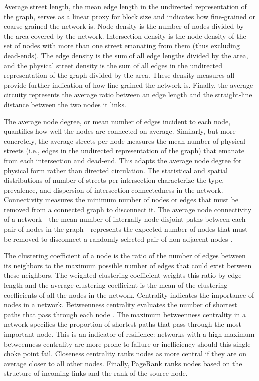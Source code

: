 \documentclass{article}
\begin{document}
Average street length, the mean edge length in the undirected representation of the graph, serves as a linear proxy for block size and indicates how fine-grained or coarse-grained the network is. Node density is the number of nodes divided by the area covered by the network. Intersection density is the node density of the set of nodes with more than one street emanating from them (thus excluding dead-ends). The edge density is the sum of all edge lengths divided by the area, and the physical street density is the sum of all edges in the undirected representation of the graph divided by the area. These density measures all provide further indication of how fine-grained the network is. Finally, the average circuity represents the average ratio between an edge length and the straight-line distance between the two nodes it links.

The average node degree, or mean number of edges incident to each node, quantifies how well the nodes are connected on average. Similarly, but more concretely, the average streets per node measures the mean number of physical streets (i.e., edges in the undirected representation of the graph) that emanate from each intersection and dead-end. This adapts the average node degree for physical form rather than directed circulation. The statistical and spatial distributions of number of streets per intersection characterize the type, prevalence, and dispersion of intersection connectedness in the network. Connectivity measures the minimum number of nodes or edges that must be removed from a connected graph to disconnect it. The average node connectivity of a network---the mean number of internally node-disjoint paths between each pair of nodes in the graph---represents the expected number of nodes that must be removed to disconnect a randomly selected pair of non-adjacent nodes \cite{beineke_average_2002}. 

The clustering coefficient of a node is the ratio of the number of edges between its neighbors to the maximum possible number of edges that could exist between these neighbors. The weighted clustering coefficient weights this ratio by edge length and the average clustering coefficient is the mean of the clustering coefficients of all the nodes in the network. Centrality indicates the importance of nodes in a network. Betweenness centrality evaluates the number of shortest paths that pass through each node \cite{barthelemy_betweenness_2004}. The maximum betweenness centrality in a network specifies the proportion of shortest paths that pass through the most important node. This is an indicator of resilience: networks with a high maximum betweenness centrality are more prone to failure or inefficiency should this single choke point fail. Closeness centrality ranks nodes as more central if they are on average closer to all other nodes. Finally, PageRank ranks nodes based on the structure of incoming links and the rank of the source node.
\end{document}
